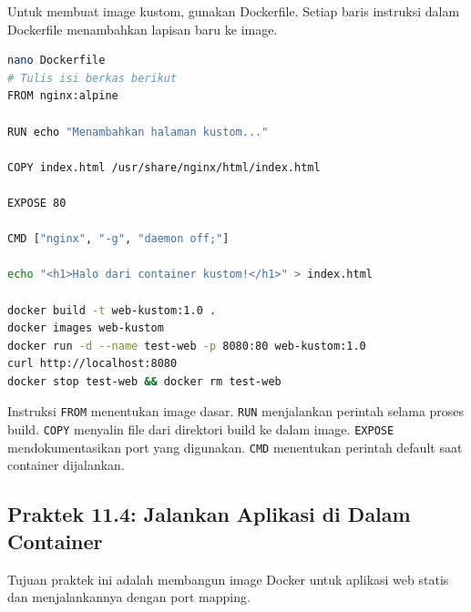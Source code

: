 Untuk membuat image kustom, gunakan Dockerfile. Setiap baris instruksi dalam
Dockerfile menambahkan lapisan baru ke image.

\begin{lstlisting}[language=bash, caption={Contoh Dockerfile dan proses build}]
nano Dockerfile
# Tulis isi berkas berikut
FROM nginx:alpine

RUN echo "Menambahkan halaman kustom..."

COPY index.html /usr/share/nginx/html/index.html

EXPOSE 80

CMD ["nginx", "-g", "daemon off;"]

echo "<h1>Halo dari container kustom!</h1>" > index.html

docker build -t web-kustom:1.0 .
docker images web-kustom
docker run -d --name test-web -p 8080:80 web-kustom:1.0
curl http://localhost:8080
docker stop test-web && docker rm test-web
\end{lstlisting}

Instruksi \texttt{FROM} menentukan image dasar. \texttt{RUN} menjalankan
perintah selama proses build. \texttt{COPY} menyalin file dari direktori build
ke dalam image. \texttt{EXPOSE} mendokumentasikan port yang digunakan. \texttt{CMD}
menentukan perintah default saat container dijalankan.

\subsection*{Praktek 11.4: Jalankan Aplikasi di Dalam Container}

Tujuan praktek ini adalah membangun image Docker untuk aplikasi web statis
dan menjalankannya dengan port mapping.

